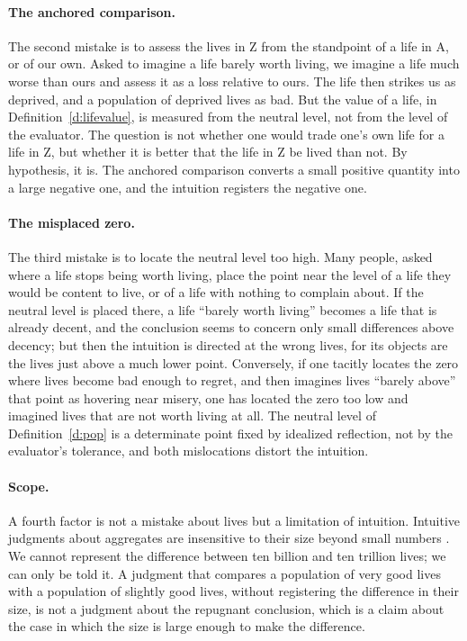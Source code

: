 \documentclass{situationist-preprint}
\begin{document}
\paragraph{The anchored comparison.} The second mistake is to assess the lives in Z from the standpoint of a life in A, or of our own. Asked to imagine a life barely worth living, we imagine a life much worse than ours and assess it as a loss relative to ours. The life then strikes us as deprived, and a population of deprived lives as bad. But the value of a life, in Definition~\ref{d:lifevalue}, is measured from the neutral level, not from the level of the evaluator. The question is not whether one would trade one's own life for a life in Z, but whether it is better that the life in Z be lived than not. By hypothesis, it is. The anchored comparison converts a small positive quantity into a large negative one, and the intuition registers the negative one.

\paragraph{The misplaced zero.} The third mistake is to locate the neutral level too high. Many people, asked where a life stops being worth living, place the point near the level of a life they would be content to live, or of a life with nothing to complain about. If the neutral level is placed there, a life ``barely worth living'' becomes a life that is already decent, and the conclusion seems to concern only small differences above decency; but then the intuition is directed at the wrong lives, for its objects are the lives just above a much lower point. Conversely, if one tacitly locates the zero where lives become bad enough to regret, and then imagines lives ``barely above'' that point as hovering near misery, one has located the zero too low and imagined lives that are not worth living at all. The neutral level of Definition~\ref{d:pop} is a determinate point fixed by idealized reflection, not by the evaluator's tolerance, and both mislocations distort the intuition.

\paragraph{Scope.} A fourth factor is not a mistake about lives but a limitation of intuition. Intuitive judgments about aggregates are insensitive to their size beyond small numbers \citep{Huemer2008}. We cannot represent the difference between ten billion and ten trillion lives; we can only be told it. A judgment that compares a population of very good lives with a population of slightly good lives, without registering the difference in their size, is not a judgment about the repugnant conclusion, which is a claim about the case in which the size is large enough to make the difference.
\end{document}
